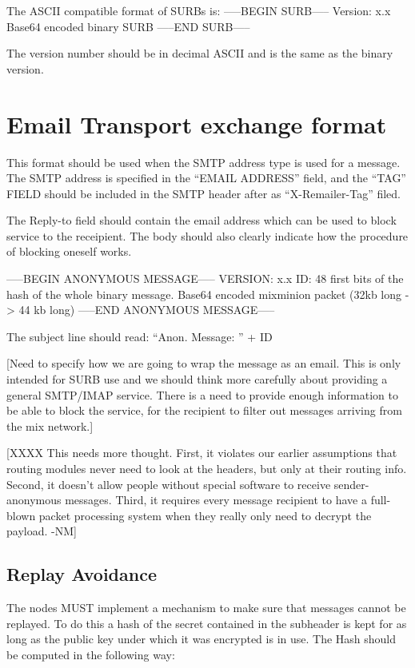 The  ASCII compatible format of SURBs is:
-----BEGIN SURB-----
Version: x.x
Base64 encoded binary SURB 
-----END SURB-----

The version number should be in decimal ASCII and is the same as the
binary version.

\section{Email Transport exchange format}

This format should be used when the SMTP address type is used for a
message. The SMTP address is specified in the ``EMAIL ADDRESS'' field,
and the ``TAG'' FIELD should be included in the SMTP header after as
``X-Remailer-Tag'' filed.

The Reply-to field should contain the email address which can be used
to block service to the receipient. The body should also clearly
indicate how the procedure of blocking oneself works.

-----BEGIN ANONYMOUS MESSAGE-----
VERSION: x.x
ID: 48 first bits of the hash of the whole binary message.
Base64 encoded mixminion packet (32kb long -> 44 kb long)
-----END ANONYMOUS MESSAGE-----

The subject line should read: ``Anon. Message: '' + ID

[Need to specify how we are going to wrap the message
 as an email. This is only intended for SURB use and
 we should think more carefully about providing a 
 general SMTP/IMAP service.
 There is a need to provide enough information to be 
 able to block the service, for the recipient to
 filter out messages arriving from the mix network.]

[XXXX This needs more thought.  First, it violates our earlier
      assumptions that routing modules never need to look at the
      headers, but only at their routing info.  Second, it doesn't
      allow people without special software to receive
      sender-anonymous messages.  Third, it requires every message
      recipient to have a full-blown packet processing system when
      they really only need to decrypt the payload.  -NM]

\subsection{Replay Avoidance}

The nodes MUST implement a mechanism to make sure that messages cannot
be replayed. To do this a hash of the secret contained in the
subheader is kept for as long as the public key under which it was
encrypted is in use. The Hash should be computed in the following way:

